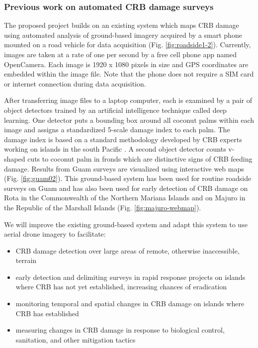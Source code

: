 \documentclass[11pt,english,letterpaper]{scrartcl}
\begin{document}
\subsubsection{Previous work on automated CRB damage surveys}
\label{previous_work}
The proposed project builds on an existing system which maps CRB damage using automated analysis of ground-based imagery acquired by a smart phone mounted on a road vehicle for data acquisition (Fig. \ref{fig:roadside1-2}). Currently, images are taken at a rate of one per second by a free cell phone app named OpenCamera. Each image is 1920 x 1080 pixels in size and GPS coordinates are embedded within the image file. Note that the phone does not require a SIM card or internet connection during data acquisition. 

After transferring image files to a laptop computer, each is examined by a pair of object detectors trained by an artificial intelligence technique called deep learning. One detector puts a bounding box around all coconut palms within each image and assigns a standardized 5-scale damage index to each palm. The damage index is based on a standard methodology developed by CRB experts working on islands in the south Pacific \cite{Mansfield2023}. A second object detector counts v-shaped cuts to coconut palm in fronds which are distinctive signs of CRB feeding damage. Results from Guam surveys are visualized using interactive web maps (Fig. \ref{fig:guam02}). This ground-based system has been used for routine roadside surveys on Guam and has also been used for early detection of CRB damage on Rota in the Commonwealth of the Northern Mariana Islands and on Majuro in the Republic of the Marshall Islands (Fig. \ref{fig:majuro-webmap}).

We will improve the existing ground-based system and adapt this system to use aerial drone imagery to facilitate:
\begin{itemize}
	\item CRB damage detection over large areas of remote, otherwise inaccessible, terrain
	\item early detection and delimiting surveys in rapid response projects on islands where CRB has not yet established, increasing chances of eradication
	\item monitoring temporal and spatial changes in CRB damage on islands where CRB has established
	\item measuring changes in CRB damage in response to biological control, sanitation, and other mitigation tactics
\end{itemize}
\end{document}

